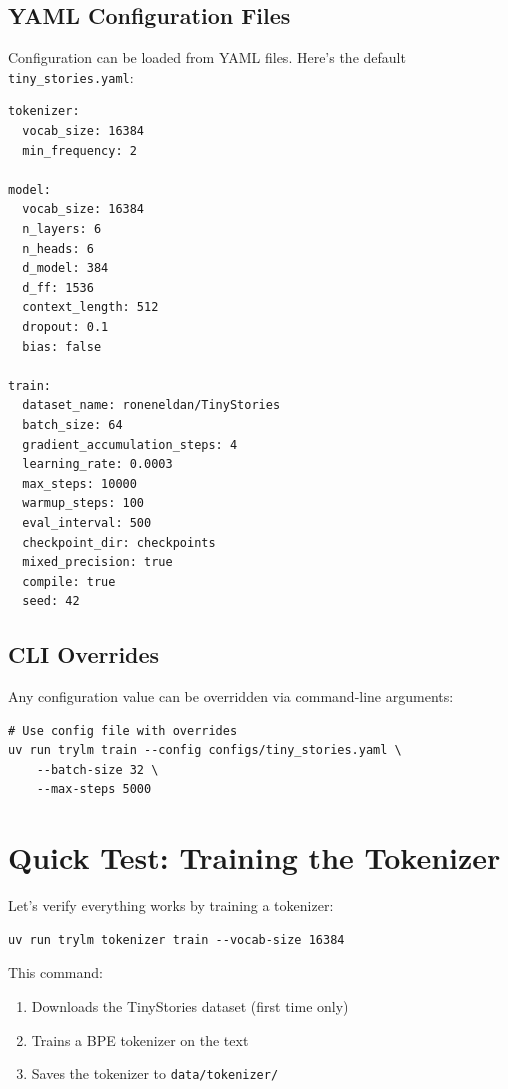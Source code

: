 \subsection{YAML Configuration Files}

Configuration can be loaded from YAML files. Here's the default \texttt{tiny\_stories.yaml}:

\begin{lstlisting}[style=yaml, caption={configs/tiny\_stories.yaml}]
tokenizer:
  vocab_size: 16384
  min_frequency: 2

model:
  vocab_size: 16384
  n_layers: 6
  n_heads: 6
  d_model: 384
  d_ff: 1536
  context_length: 512
  dropout: 0.1
  bias: false

train:
  dataset_name: roneneldan/TinyStories
  batch_size: 64
  gradient_accumulation_steps: 4
  learning_rate: 0.0003
  max_steps: 10000
  warmup_steps: 100
  eval_interval: 500
  checkpoint_dir: checkpoints
  mixed_precision: true
  compile: true
  seed: 42
\end{lstlisting}

\subsection{CLI Overrides}

Any configuration value can be overridden via command-line arguments:

\begin{lstlisting}[style=shell]
# Use config file with overrides
uv run trylm train --config configs/tiny_stories.yaml \
    --batch-size 32 \
    --max-steps 5000
\end{lstlisting}

\section{Quick Test: Training the Tokenizer}

Let's verify everything works by training a tokenizer:

\begin{lstlisting}[style=shell]
uv run trylm tokenizer train --vocab-size 16384
\end{lstlisting}

This command:
\begin{enumerate}
    \item Downloads the TinyStories dataset (first time only)
    \item Trains a BPE tokenizer on the text
    \item Saves the tokenizer to \texttt{data/tokenizer/}
\end{enumerate}

